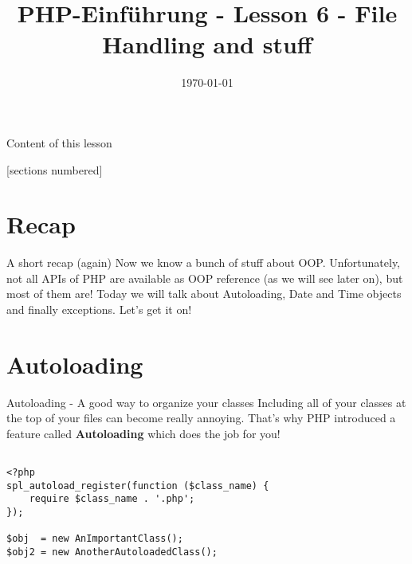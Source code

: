 


\newcommand{\topic}{
	PHP-Einführung - Lesson 6 - File Handling and stuff
}

\title{\topic}
\date{\today}



\maketitle

\begin{frame}{Content of this lesson}

	[sections numbered]
	\tableofcontents

\end{frame}

\section{Recap}

\begin{frame}{A short recap (again)}
	Now we know a bunch of stuff about OOP. Unfortunately, not all APIs of PHP are available as OOP reference (as we will see later on), but most of them are! \pause
	Today we will talk about Autoloading, Date and Time objects and finally exceptions. Let's get it on!
\end{frame}

\section{Autoloading}

\begin{frame}[fragile]{Autoloading - A good way to organize your classes}
	Including all of your classes at the top of your files can become really annoying. \pause That's why PHP introduced a feature called \textbf{Autoloading} which does the job for you! \pause
	
	\begin{lstlisting}
	
<?php
spl_autoload_register(function ($class_name) {
    require $class_name . '.php';
});

$obj  = new AnImportantClass();
$obj2 = new AnotherAutoloadedClass(); 

	\end{lstlisting}
	
\end{frame}

